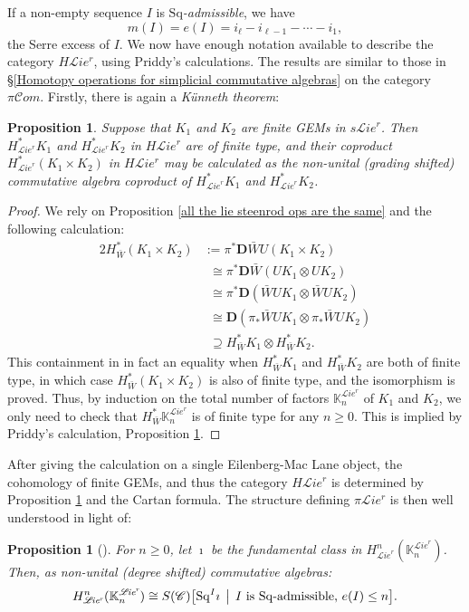 \documentclass[11pt]{amsart} \renewcommand{\baselinestretch}{1.2}
\theoremstyle{plain}
\newtheorem{prop}[thm]{Proposition}
\theoremstyle{definition}
\newcommand{\scrL}{\mathscr{L}}
\newcommand{\scrC}{\mathscr{C}}
\newcommand{\citeBOX}[2][]{\cite[\mbox{#1}]{#2}}
\newcommand{\CommOperad}{{\scrC}}
\newcommand{\PA}[1]{\pi#1}
\newcommand{\HA}[1]{H#1}
\newcommand{\minDimDelta}{m}
\newcommand{\Sq}{\mathrm{Sq}}
\newcommand{\algs}{{\scrC\!\textit{om}}}
\newcommand{\restliealgs}{{\scrL\!\textit{ie}^\textit{r}}}
\newcommand{\dual}{\mathbf{D}}
\begin{document}
\begin{Constructing cohomology operations}
If a non-empty sequence $I$  is \emph{$\Sq$-admissible}, we have 
\[\minDimDelta(I)=e(I)=i_\ell-i_{\ell-1}-\cdots -i_1,\]
the Serre excess of $I$. We now have enough notation available to describe the category $\HA{\restliealgs}$, using Priddy's calculations. The results are similar to those in \S\ref{Homotopy operations for simplicial commutative algebras} on the category $\PA{\algs}$.
Firstly, there is again  a \emph{K\"unneth theorem}:
\begin{prop}
\label{Prop on cohomology of product of finite lie gems}
Suppose that $K_1$ and $K_2$ are finite GEMs in $s\restliealgs$. Then $H^*_\restliealgs K_1$ and $H^*_\restliealgs K_2$ in $\HA{\restliealgs}$ are of finite type, and their coproduct
$H^*_\restliealgs(K_1\times K_2)$ in $\HA{\restliealgs}$ may be calculated as the non-unital (grading shifted) commutative algebra coproduct of $H^*_\restliealgs K_1$ and $H^*_\restliealgs K_2$.
\end{prop}
\begin{proof}
We rely on Proposition \ref{all the lie steenrod ops are the same} and the following calculation:
\begin{alignat*}{2}
H^*_{\bar{W}}(K_1\times K_2)
&:=
\pi^*\dual \bar{W}U(K_1\times K_2)%
\\
&\phantom{:}\cong
\pi^*\dual \bar{W}(UK_1\otimes UK_2)%
\\
&\phantom{:}\cong
\pi^*\dual (\bar{W}UK_1\otimes \bar{W}UK_2)%
\\
&\phantom{:}\cong
\dual (\pi_*\bar{W}UK_1\otimes \pi_*\bar{W}UK_2)%
\\
&\phantom{:}\supseteq
H^*_{\bar{W}}K_1\otimes H^*_{\bar{W}}K_2.
\end{alignat*}
This containment in in fact an equality when $H^*_{\bar{W}}K_1 $ and $H^*_{\bar{W}}K_2$ are both of finite type, in which case $H^*_{\bar{W}}(K_1\times K_2)$ is also of finite type, and the isomorphism is proved. Thus, by induction on the total number of factors $\mathbb{K}_n^{\restliealgs}$ of $K_1$ and $K_2$, we only need to check that $H^*_{\bar{W}}\mathbb{K}_n^{\restliealgs}$ is of finite type for any $n\geq0$. This is implied by Priddy's calculation, Proposition \ref{calc of restliecoh on single EMobject}.
\end{proof}
\noindent After giving the calculation on a single Eilenberg-Mac Lane object, the cohomology of finite GEMs, and thus the category $\HA{\restliealgs}$ is determined by Proposition \ref{Prop on cohomology of product of finite lie gems} and the Cartan formula. The structure defining $\PA{\restliealgs}$ is then well understood in light of:
\begin{prop}[{\citeBOX[6.1]{PriddySimplicialLie.pdf}}]
\label{calc of restliecoh on single EMobject}
For $n\geq0$, let $\imath$ be the fundamental class in $H^n_{\restliealgs}(\mathbb{K}_n^{\restliealgs})$. Then, as non-unital (degree shifted) commutative algebras:
\[H^n_{\restliealgs}(\mathbb{K}_n^{\restliealgs})\cong S(\CommOperad)\bigl[\Sq^I\imath\,\bigm|\,\textup{$I$ is $\Sq$-admissible, $e(I)\leq n$}\bigr].\]
\end{prop}


\end{Constructing cohomology operations}
\end{document}
